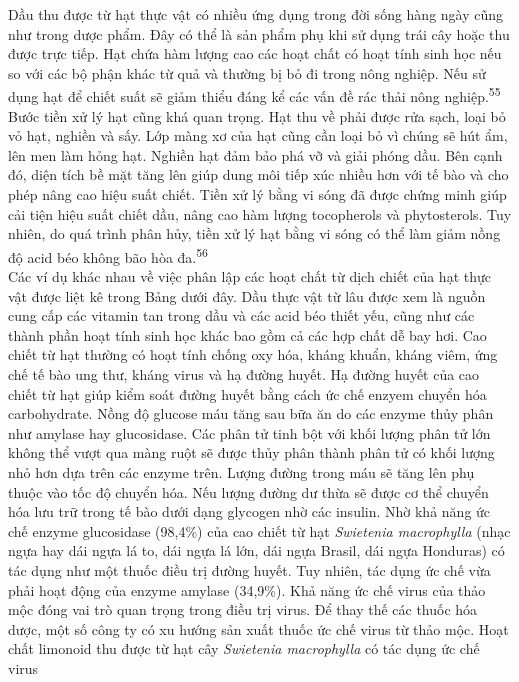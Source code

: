 \documentclass[
  letterpaper,
  DIV=11,
  numbers=noendperiod]{scrartcl}
\begin{document}
Dầu thu được từ hạt thực vật có nhiều ứng dụng trong đời sống hàng ngày
cũng như trong dược phẩm. Đây có thể là sản phẩm phụ khi sử dụng trái
cây hoặc thu được trực tiếp. Hạt chứa hàm lượng cao các hoạt chất có
hoạt tính sinh học nếu so với các bộ phận khác từ quả và thường bị bỏ đi
trong nông nghiệp. Nếu sử dụng hạt để chiết suất sẽ giảm thiểu đáng kể
các vấn đề rác thải nông nghiệp.\textsuperscript{55} Bước tiền xử lý hạt
cũng khá quan trọng. Hạt thu về phải được rửa sạch, loại bỏ vỏ hạt,
nghiền và sấy. Lớp màng xơ của hạt cũng cần loại bỏ vì chúng sẽ hút ẩm,
lên men làm hỏng hạt. Nghiền hạt đảm bảo phá vỡ và giải phóng dầu. Bên
cạnh đó, diện tích bề mặt tăng lên giúp dung môi tiếp xúc nhiều hơn với
tế bào và cho phép nâng cao hiệu suất chiết. Tiền xử lý bằng vi sóng đã
được chứng minh giúp cải tiện hiệu suất chiết dầu, nâng cao hàm lượng
tocopherols và phytosterols. Tuy nhiên, do quá trình phân hủy, tiền xử
lý hạt bằng vi sóng có thể làm giảm nồng độ acid béo không bão hòa
đa.\textsuperscript{56}\\
Các ví dụ khác nhau về việc phân lập các hoạt chất từ dịch chiết của hạt
thực vật được liệt kê trong Bảng dưới đây. Dầu thực vật từ lâu được xem
là nguồn cung cấp các vitamin tan trong dầu và các acid béo thiết yếu,
cũng như các thành phần hoạt tính sinh học khác bao gồm cả các hợp chất
dễ bay hơi. Cao chiết từ hạt thường có hoạt tính chống oxy hóa, kháng
khuẩn, kháng viêm, ứng chế tế bào ung thư, kháng virus và hạ đường
huyết. Hạ đường huyết của cao chiết từ hạt giúp kiểm soát đường huyết
bằng cách ức chế enzyem chuyển hóa carbohydrate. Nồng độ glucose máu
tăng sau bữa ăn do các enzyme thủy phân như amylase hay glucosidase. Các
phân tử tinh bột với khối lượng phân tử lớn không thể vượt qua màng ruột
sẽ được thủy phân thành phân tử có khối lượng nhỏ hơn dựa trên các
enzyme trên. Lượng đường trong máu sẽ tăng lên phụ thuộc vào tốc độ
chuyển hóa. Nếu lượng đường dư thừa sẽ được cơ thể chuyển hóa lưu trữ
trong tế bào dưới dạng glycogen nhờ các insulin. Nhờ khả năng ức chế
enzyme glucosidase (98,4\%) của cao chiết từ hạt \emph{Swietenia
macrophylla} (nhạc ngựa hay dái ngựa lá to, dái ngựa lá lớn, dái ngựa
Brasil, dái ngựa Honduras) có tác dụng như một thuốc điều trị đường
huyết. Tuy nhiên, tác dụng ức chế vừa phải hoạt động của enzyme amylase
(34,9\%). Khả năng ức chế virus của thảo mộc đóng vai trò quan trọng
trong điều trị virus. Để thay thế các thuốc hóa dược, một số công ty có
xu hướng sản xuất thuốc ức chế virus từ thảo mộc. Hoạt chất limonoid thu
được từ hạt cây \emph{Swietenia macrophylla} có tác dụng ức chế virus
\end{document}
